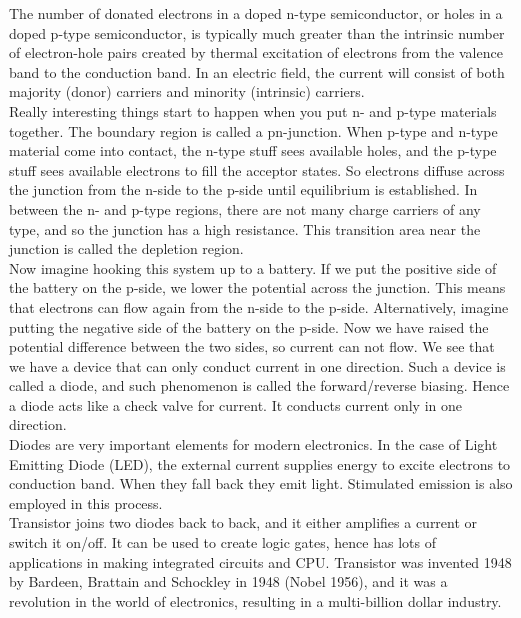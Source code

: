 \documentclass[11pt]{article}
\theoremstyle{break}
\theoremstyle{break}
\begin{document}
The number of donated electrons in a doped n-type semiconductor, or holes in a doped p-type semiconductor, is typically much greater than the intrinsic number of electron-hole pairs created by thermal excitation of electrons from the valence band to the conduction band. In an electric field, the current will consist of both majority (donor) carriers and minority (intrinsic) carriers.\\


Really interesting things start to happen when you put n- and p-type materials together. The boundary region is called a pn-junction. When p-type and n-type material come into contact, the n-type stuff sees available holes, and the p-type stuff sees available electrons to fill the acceptor states. So electrons diffuse across
the junction from the n-side to the p-side until equilibrium is established. In between the n- and p-type regions, there are not many charge carriers of any type, and so the junction has a high resistance. This transition area near the junction is called the depletion region.\\


Now imagine hooking this system up to a battery. If we put the positive side of the battery on the p-side, we lower the potential across the junction. This means
that electrons can flow again from the n-side to the p-side. Alternatively, imagine putting the negative side of the battery on the p-side. Now we have raised the potential difference between the two sides, so current can not flow. We see that we have a device that can only conduct current in one direction. Such a device is called a diode, and such phenomenon is called the forward/reverse biasing. Hence a diode acts like a check valve for current. It conducts current only in one direction.\\

Diodes are very important elements for modern electronics. In the case of Light Emitting Diode (LED), the external current supplies energy to excite electrons to conduction band. When they fall back they emit light. Stimulated emission is also employed in this process. \\

Transistor joins two diodes back to back, and it either amplifies a current or switch it on/off. It can be used to create logic gates, hence has lots of applications in making integrated circuits and CPU.
Transistor was invented 1948 by Bardeen, Brattain and Schockley in 1948 (Nobel 1956), and it was a revolution in the world of electronics, resulting in a multi-billion dollar industry.\\
\end{document}
